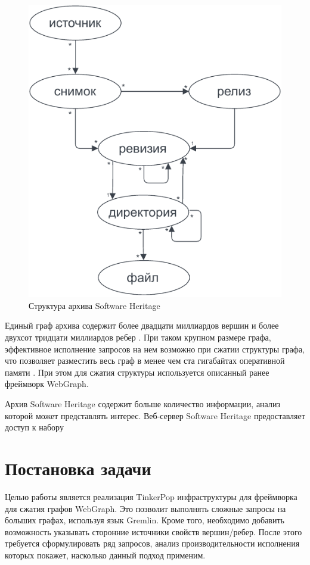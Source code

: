 \documentclass[times,specification,annotation]{itmo-student-thesis}
\begin{document}
\begin{figure}[!h]
\caption{Структура архива Software Heritage}\label{fig1}
\centering
\includegraphics{swh-graph-structure.pdf}
\end{figure}

Единый граф архива содержит более двадцати миллиардов вершин и более двухсот тридцати миллиардов ребер \cite{swh-dataset}. При таком крупном размере графа, эффективное исполнение запросов на нем возможно при сжатии структуры графа, что позволяет разместить весь граф в менее чем ста гигабайтах оперативной памяти \cite{saner}. При этом для сжатия структуры используется описанный ранее фреймворк WebGraph.

Архив Software Heritage содержит больше количество информации, анализ которой может представлять интерес. Веб-сервер Software Heritage предоставляет доступ к набору 

\section{Постановка задачи}

Целью работы является реализация TinkerPop инфраструктуры для фреймворка для сжатия графов WebGraph. Это позволит выполнять сложные запросы на больших графах, используя язык Gremlin. Кроме того, необходимо добавить возможность указывать сторонние источники свойств вершин/ребер. После этого требуется сформулировать ряд запросов, анализ производительности исполнения которых покажет, насколько данный подход применим.
\end{document}
